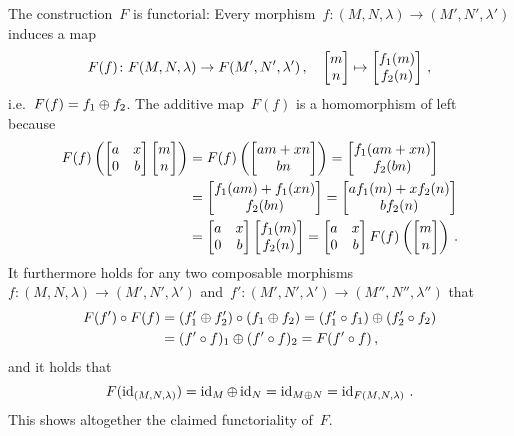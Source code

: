 The construction~$F$ is functorial:
Every morphism~$f \colon (M, N, \lambda) \to (M', N', \lambda')$ induces a map
\[
          F(f)
  \colon  F(M,N,\lambda)
  \to     F(M',N',\lambda') \,,
  \quad   \begin{bmatrix} m \\ n \end{bmatrix}
  \mapsto \begin{bmatrix} f_1(m) \\ f_2(n) \end{bmatrix} \,,
\]
i.e.\ $F(f) = f_1 \oplus f_2$.
The additive map~$F(f)$ is a homomorphism of left~{} because
\begin{align*}
  F(f)
  \left(
    \begin{bmatrix}
      a & x \\
      0 & b
    \end{bmatrix}
    \begin{bmatrix} m \\ n \end{bmatrix}
  \right)
  &=
  F(f)
  \left(
    \begin{bmatrix}  am + xn \\ bn  \end{bmatrix}
  \right)
  =
  \begin{bmatrix}  f_1(am + xn) \\ f_2(bn)  \end{bmatrix}
  \\
  &=
  \begin{bmatrix}  f_1(am) + f_1(xn) \\ f_2(bn)  \end{bmatrix}
  =
  \begin{bmatrix}  a f_1(m) + x f_2(n) \\ b f_2(n)  \end{bmatrix}
  \\
  &=
  \begin{bmatrix}
    a & x \\
    0 & b
  \end{bmatrix}
  \begin{bmatrix}  f_1(m) \\ f_2(n)  \end{bmatrix}
  =
  \begin{bmatrix}
    a & x \\
    0 & b
  \end{bmatrix}
  F(f)
  \left(
    \begin{bmatrix} m \\ n \end{bmatrix}
  \right) \,.
\end{align*}
It furthermore holds for any two composable morphisms~$f \colon (M, N, \lambda) \to (M', N', \lambda')$ and~$f' \colon (M', N', \lambda') \to (M'', N'', \lambda'')$ that
\begin{align*}
      F(f') \circ F(f)
  &=  (f'_1 \oplus f'_2) \circ (f_1 \oplus f_2)
   =  (f'_1 \circ f_1) \oplus (f'_2 \circ f_2) \\
  &=  (f' \circ f)_1 \oplus (f' \circ f)_2
   =  F(f' \circ f) \,,
\end{align*}
and it holds that
\[
  F(\operatorname{id}_{(M, N, \lambda)})
  =
  \operatorname{id}_M \oplus \operatorname{id}_N
  =
  \operatorname{id}_{M \oplus N}
  =
  \operatorname{id}_{F(M, N, \lambda)} \,.
\]
This shows altogether the claimed functoriality of~$F$.




















